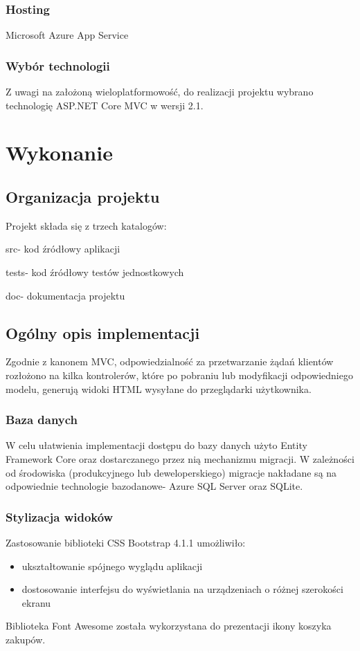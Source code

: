 \documentclass[a4paper,10pt]{article}
\begin{document}
\subsubsection{Hosting}
Microsoft Azure App Service
\subsubsection{Wybór technologii}
Z uwagi na założoną wieloplatformowość, do realizacji projektu wybrano technologię ASP.NET Core MVC w wersji 2.1.

\section{Wykonanie}
\subsection{Organizacja projektu}
Projekt składa się z trzech katalogów:
\begin{description}
 \item src- kod źródłowy aplikacji
 \item tests- kod źródłowy testów jednostkowych
 \item doc- dokumentacja projektu
\end{description}
\subsection{Ogólny opis implementacji}

Zgodnie z kanonem MVC, odpowiedzialność za przetwarzanie żądań klientów rozłożono na kilka kontrolerów, które po pobraniu lub modyfikacji odpowiedniego modelu, generują widoki HTML wysyłane do przeglądarki użytkownika.
\subsubsection{Baza danych}
W celu ułatwienia implementacji dostępu do bazy danych użyto Entity Framework Core oraz dostarczanego przez nią mechanizmu migracji.
\newline
W zależności od środowiska (produkcyjnego lub deweloperskiego) migracje nakładane są na odpowiednie technologie bazodanowe- Azure SQL Server oraz SQLite.

\subsubsection{Stylizacja widoków} 
Zastosowanie biblioteki CSS Bootstrap 4.1.1 umożliwiło:
\begin{itemize}
 \item ukształtowanie spójnego wyglądu aplikacji
 \item dostosowanie interfejsu do wyświetlania na urządzeniach o różnej szerokości ekranu
\end{itemize}
\par
Biblioteka Font Awesome została wykorzystana do prezentacji ikony koszyka zakupów.
\end{document}
